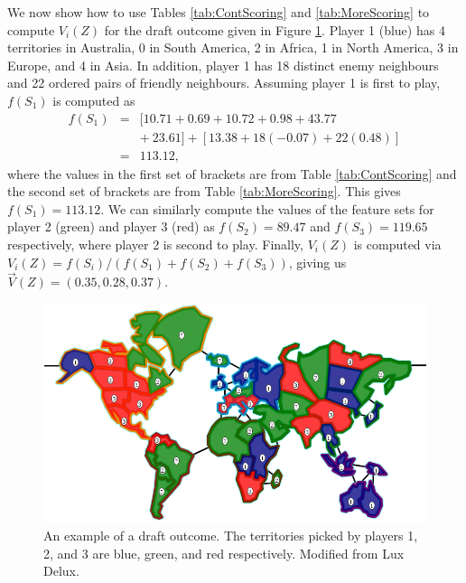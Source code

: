 \documentclass[letterpaper]{article}
\numberwithin{equation}{section}
\numberwithin{theorem}{section}
\numberwithin{lemma}{section}
\numberwithin{df}{section}
\begin{document}
We now show how to use Tables \ref{tab:ContScoring} and \ref{tab:MoreScoring} to compute $V_i(Z)$ for the draft outcome given in Figure \ref{fig:DraftExample}.  Player 1 (blue) has 4 territories in Australia, 0 in South America, 2 in Africa, 1 in North America, 3 in Europe, and 4 in Asia.  In addition, player 1 has 18 distinct enemy neighbours and 22 ordered pairs of friendly neighbours.  Assuming player 1 is first to play, $f(S_1)$ is computed as
\begin{eqnarray*}
 	f(S_1) &=& [10.71 + 0.69 + 10.72 + 0.98 + 43.77 \\ &&+\ 23.61] + [13.38 + 18(-0.07) + 22(0.48)] \\
 				 &=& 113.12,
\end{eqnarray*}
where the values in the first set of brackets are from Table \ref{tab:ContScoring} and the second set of brackets are from Table \ref{tab:MoreScoring}.  This gives $f(S_1) = 113.12$.  We can similarly compute the values of the feature sets for player 2 (green) and player 3 (red) as %
$f(S_2) = 89.47$ and $f(S_3) = 119.65$ respectively, where player 2 is second to play.  Finally, $V_i(Z)$ is computed via $V_i(Z) = f(S_i) / \left(f(S_1) + f(S_2) + f(S_3) \right)$, giving us %
$\vec{V}(Z) = (0.35, 0.28, 0.37)$.


\begin{figure}[t]
	\centering
	\includegraphics[scale=0.3]{../ForPublication/figs/DraftExample.png}
	\caption{An example of a draft outcome.  The territories picked by players 1, 2, and 3 are blue, green, and red respectively.  %
	Modified from Lux Delux.}
	\label{fig:DraftExample}
\end{figure}
\end{document}
